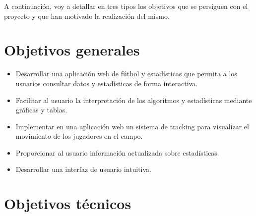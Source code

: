 
A continuación,  voy a detallar en tres tipos los objetivos que se persiguen con el proyecto y que han motivado la realización del mismo.

\section{Objetivos generales}

\begin{itemize}
    \item Desarrollar una aplicación web de fútbol y estadísticas que permita a los usuarios consultar datos y estadísticas de forma interactiva.
    \item Facilitar al usuario la interpretación de los algoritmos y estadísticas mediante gráficas y tablas.
    \item Implementar en una aplicación web un sistema de tracking para visualizar el movimiento de los jugadores en el campo.
    \item Proporcionar al usuario información actualizada sobre estadísticas.
    \item Desarrollar una interfaz de usuario intuitiva.
\end{itemize}

\section{Objetivos técnicos}

